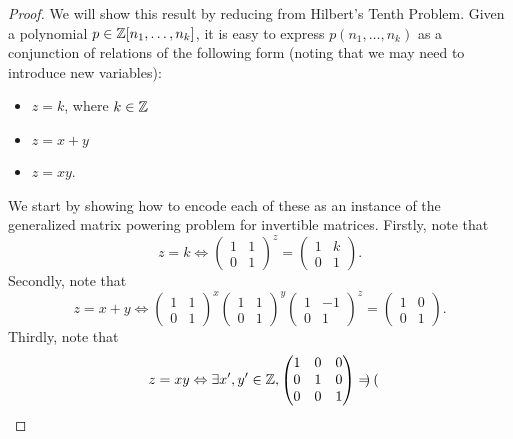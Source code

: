 \begin{proof}
We will show this result by reducing from Hilbert's Tenth Problem. Given a polynomial $p \in \mathbb{Z}[n_{1}, \ldots, n_{k}]$, it is easy to express $p(n_{1}, \ldots, n_{k})$ as a conjunction of relations of the following form (noting that we may need to introduce new variables):
\begin{itemize}
\item $z = k$, where $k \in \mathbb{Z}$
\item $z = x+y$
\item $z = xy$.
\end{itemize}
We start by showing how to encode each of these as an instance of the generalized matrix powering problem for invertible matrices.
Firstly, note that
\begin{equation*}
z = k \Leftrightarrow
\begin{pmatrix}
    1 & 1 \\
    0 & 1
\end{pmatrix}^{z} =
\begin{pmatrix}
    1 & k \\
    0 & 1
\end{pmatrix}.
\end{equation*}
Secondly, note that
\begin{equation*}
    z = x + y \Leftrightarrow
\begin{pmatrix}
    1 & 1 \\
    0 & 1
\end{pmatrix}^{x}
\begin{pmatrix}
    1 & 1 \\
    0 & 1
\end{pmatrix}^{y}
\begin{pmatrix}
    1 & -1 \\
    0 & 1
\end{pmatrix}^{z} =
\begin{pmatrix}
    1 & 0 \\
    0 & 1
\end{pmatrix}.
\end{equation*}
Thirdly, note that
\begin{equation*}
    z = xy \Leftrightarrow
    \exists x',y' \in \mathbb{Z},
    \begin{pmatrix}
        1 & 0 & 0 \\
        0 & 1 & 0 \\
        0 & 0 & 1
    \end{pmatrix} =
    \begin{pmatrix}

\end{pmatrix}
\end{equation*}
\end{proof}
